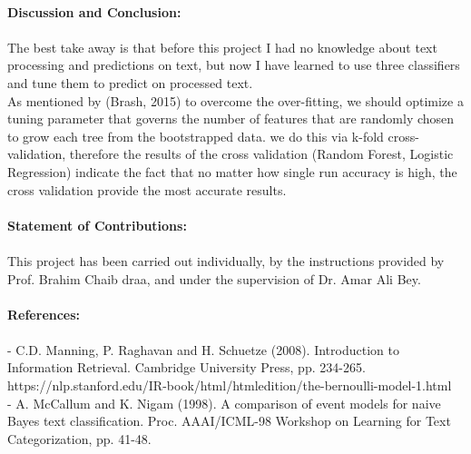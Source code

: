 \documentclass[12pt]{report}
\begin{document}
	\paragraph{Discussion and Conclusion:}
	\paragraph{}
	The best take away is that before this project I had no knowledge about text processing and predictions on text, but now I have learned to use three classifiers and tune them to predict on processed text. \\
	As mentioned by (Brash, 2015) to overcome the over-fitting, we should optimize a tuning parameter that governs the number of features that are randomly chosen to grow each tree from the bootstrapped data. we do this via k-fold cross-validation, therefore the results of the cross validation (Random Forest, Logistic Regression) indicate the fact that no matter how single run accuracy is high, the cross validation provide the most accurate results.\\
		
	
	\paragraph{Statement of Contributions:}
	\paragraph{}
	This project has been carried out individually, by the instructions provided by Prof. Brahim Chaib draa, and under the supervision of Dr. Amar Ali Bey.\\
	
	\paragraph{References:}
	\paragraph{}
	- C.D. Manning, P. Raghavan and H. Schuetze (2008). Introduction to Information Retrieval. Cambridge University Press, pp. 234-265. https://nlp.stanford.edu/IR-book/html/htmledition/the-bernoulli-model-1.html\\
	
	- A. McCallum and K. Nigam (1998). A comparison of event models for naive Bayes text classification. Proc. AAAI/ICML-98 Workshop on Learning for Text Categorization, pp. 41-48.\\
	
\end{document}
